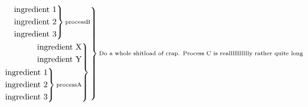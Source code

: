 \documentclass[12pt]{standalone}
\begin{document}
\[
\begin{rcases}\begin{alignedat}{3}
\begin{rcases}\begin{alignedat}{3}
\text{ingredient 1}\\
\text{ingredient 2}\\
\text{ingredient 3}\\
\end{alignedat}\end{rcases}
\substack{\text{processB}}\\
\begin{rcases}\begin{alignedat}{3}
\text{ingredient X}\\
\text{ingredient Y}\\
\begin{rcases}\begin{alignedat}{3}
\text{ingredient 1}\\
\text{ingredient 2}\\
\text{ingredient 3}\\
\end{alignedat}\end{rcases}
\substack{\text{processA}}\\
\end{alignedat}\end{rcases}
\substack{\text{}}\\
\end{alignedat}\end{rcases}
\substack{\text{Do a whole shitload of crap. Process C is reallllllllllly rather quite long}}\\
\]
\end{document}

